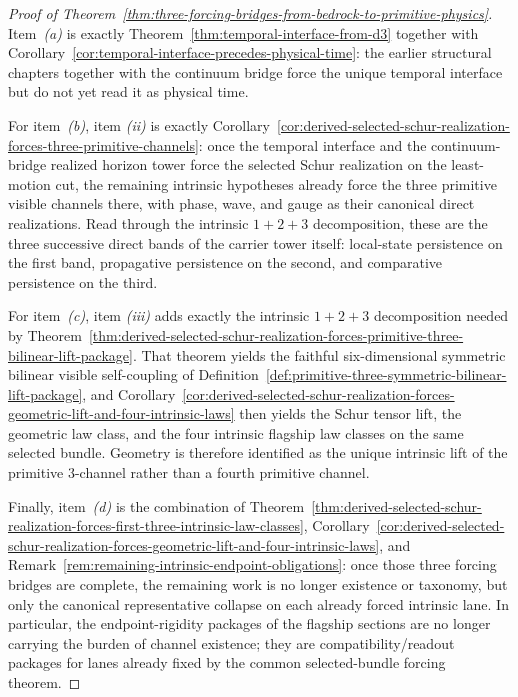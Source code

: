 \begin{proof}[Proof of Theorem~\ref{thm:three-forcing-bridges-from-bedrock-to-primitive-physics}]
\label{proof:thm:three-forcing-bridges-from-bedrock-to-primitive-physics}
Item~\emph{(a)} is exactly
Theorem~\ref{thm:temporal-interface-from-d3} together with
Corollary~\ref{cor:temporal-interface-precedes-physical-time}: the earlier
structural chapters together with the continuum bridge force the unique
temporal interface but do not yet read it as physical time.

For item~\emph{(b)}, item \emph{(ii)} is exactly
Corollary~\ref{cor:derived-selected-schur-realization-forces-three-primitive-channels}:
once the temporal interface and the continuum-bridge realized horizon tower force the
selected Schur realization on the least-motion cut, the remaining intrinsic
hypotheses already force the three primitive visible channels there, with
phase, wave, and gauge as their canonical direct realizations. Read through
the intrinsic \(1+2+3\) decomposition, these are the three successive direct
bands of the carrier tower itself: local-state persistence on the first band,
propagative persistence on the second, and comparative persistence on the
third.

For item~\emph{(c)}, item \emph{(iii)} adds exactly the intrinsic \(1+2+3\)
decomposition needed by
Theorem~\ref{thm:derived-selected-schur-realization-forces-primitive-three-bilinear-lift-package}.
That theorem yields the faithful six-dimensional symmetric bilinear visible
self-coupling of
Definition~\ref{def:primitive-three-symmetric-bilinear-lift-package}, and
Corollary~\ref{cor:derived-selected-schur-realization-forces-geometric-lift-and-four-intrinsic-laws}
then yields the Schur tensor lift, the geometric law class, and the four
intrinsic flagship law classes on the same selected bundle. Geometry is
therefore identified as the unique intrinsic lift of the primitive
\(3\)-channel rather than a fourth primitive channel.

Finally, item~\emph{(d)} is the combination of
Theorem~\ref{thm:derived-selected-schur-realization-forces-first-three-intrinsic-law-classes},
Corollary~\ref{cor:derived-selected-schur-realization-forces-geometric-lift-and-four-intrinsic-laws},
and Remark~\ref{rem:remaining-intrinsic-endpoint-obligations}: once those
three forcing bridges are complete, the remaining work is no longer existence
or taxonomy, but only the canonical representative collapse on each already
forced intrinsic lane. In particular, the endpoint-rigidity packages of the
flagship sections are no longer carrying the burden of channel existence; they
are compatibility/readout packages for lanes already fixed by the common
selected-bundle forcing theorem.
\end{proof}


